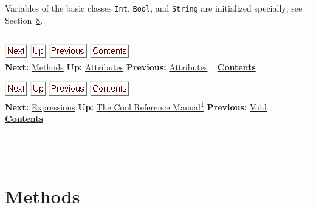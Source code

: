 \documentclass[]{article}
\begin{document}
Variables of the basic classes \texttt{Int}, \texttt{Bool}, and
\texttt{String} are initialized specially; see
Section~\href{node26.html\#sec-basic}{8}.

\begin{center}\rule{3in}{0.4pt}\end{center}

\href{node12.html}{\includegraphics{next.png}}
\href{node10.html}{\includegraphics{up.png}}
\href{node10.html}{\includegraphics{prev.png}}
\href{node1.html}{\includegraphics{contents.png}} \\ \textbf{Next:}
\href{node12.html}{Methods} \textbf{Up:} \href{node10.html}{Attributes}
\textbf{Previous:} \href{node10.html}{Attributes} ~
\textbf{\href{node1.html}{Contents}}

\href{node13.html}{\includegraphics{next.png}}
\href{cool-manual.html}{\includegraphics{up.png}}
\href{node11.html}{\includegraphics{prev.png}}
\href{node1.html}{\includegraphics{contents.png}} \\ \textbf{Next:}
\href{node13.html}{Expressions} \textbf{Up:} \href{cool-manual.html}{The
Cool Reference Manual\textsuperscript{1}} \textbf{Previous:}
\href{node11.html}{Void} ~ \textbf{\href{node1.html}{Contents}} \\ \\

\section{\\ Methods}
\end{document}
